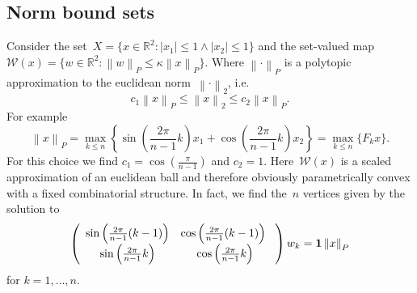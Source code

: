 \documentclass{elsarticle}
\providecommand{\norm}[1]{\left\|#1\right\|}
\providecommand{\abs}[1]{\left|#1\right|}
\theoremstyle{remark}
\theoremstyle{definition}
\begin{document}
\subsection{Norm bound sets}\label{ssec:example:one}
%
Consider the set~$X = \{x\in\mathbb R^2: \abs{x_1}\leq 1\wedge \abs{x_2}\leq 1\}$ and the set-valued map $\mathcal W(x) = \{w\in\mathbb R^2: \norm{w}_P\leq\kappa\norm{x}_P\}$.
%
Where $\norm{\cdot}_P$ is a polytopic approximation to the euclidean norm~$\norm{\cdot}_2$, i.e.
%
$$
c_1 \norm{x}_P\leq\norm{x}_2\leq c_2\norm{x}_P.
$$
%
For example
%
$$
\norm{x}_P = \max_{k\leq n}\left\{\sin\left(\frac{2\pi}{n-1}k\right) x_1 + \cos\left(\frac{2\pi}{n-1}k\right) x_2\right\} = \max_{k\leq n}\{F_k x\}.
$$
%
For this choice we find $c_1 = \cos\left(\frac{\pi}{n-1}\right)$ and $c_2=1$.
%
Here~$\mathcal W(x)$ is a scaled approximation of an euclidean ball and therefore obviously parametrically convex with a fixed combinatorial structure.
%
In fact, we find the~$n$ vertices given by the solution to
%
$$
  \left(\begin{array}{cc}
  \sin\left(\frac{2\pi}{n-1}(k-1)\right) & \cos\left(\frac{2\pi}{n-1}(k-1)\right) \\
  \sin\left(\frac{2\pi}{n-1}k\right) & \cos\left(\frac{2\pi}{n-1}k\right)
  \end{array}
  \right) w_k = {\bf{1}}\norm{x}_P
$$
%
for $k=1,\dots,n$.
\end{document}
